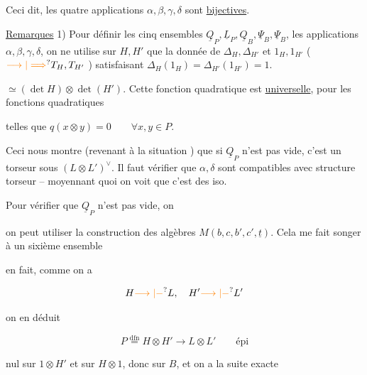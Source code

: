 Ceci dit, les quatre applications
$\alpha,\beta,\gamma,\delta$ sont \uline{bijectives}.

\uline{Remarques} 1) Pour définir les cinq
ensembles $\underline Q_P,\underline L_P,\underline Q_B,\underline\Psi_B,\underline\Psi_B$, 
les applications $\alpha,\beta,\gamma,\delta$, on ne
utilise sur $H,H'$ que la donnée
de $\Delta_H,\Delta_{H'}$ et $1_H,1_{H'}$ ($\unsure{\longrightarrow|\Longrightarrow}T_H,T_{H'}$ )
satisfaisant $\Delta_H(1_H)=\Delta_{H'}(1_{H'})=1$.


$\simeq(\det H)\otimes\det(H')$. Cette  fonction
quadratique est \uline{universelle}, pour
les fonctions quadratiques


telles que $q(x\otimes y)=0\qquad\forall x,y\in P$.

Ceci nous montre  (revenant
à  la situation ) que
si $\underline Q_P$ n'est pas vide, c'est un torseur
sous  $(L\otimes L')^\vee$. Il faut vérifier
que $\alpha,\delta$ sont compatibles avec
structure torseur -- moyennant quoi
on voit que c'est des iso.

Pour vérifier que $\underline Q_P$ n'est pas
vide, on 

on peut utiliser la construction
des algèbres $M(b,c,b',c',\underline t)$. Cela
me fait songer à un sixième
ensemble


en fait, comme on a

\[
H\unsure{\longrightarrow|-}L,\quad H'\unsure{\longrightarrow|-} L'
\]

on en déduit

\[
P\overset{\mathrm{dfn}}{=}H\otimes H'\longrightarrow L\otimes L'\qquad\text{épi}
\]

nul sur $1\otimes H'$ et sur $H\otimes1$, donc sur
$B$, et on a la suite exacte


